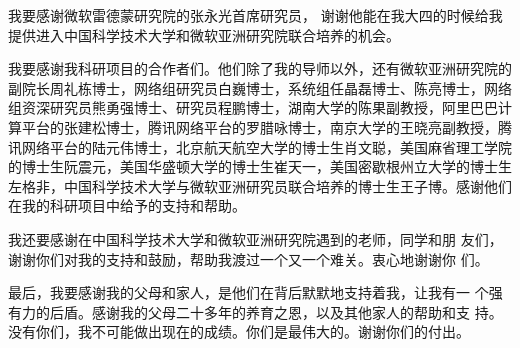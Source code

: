 \begin{acknowledgements}
我要感谢微软雷德蒙研究院的张永光首席研究员，
谢谢他能在我⼤四的时候给我提供进⼊中国科学技术⼤学和微软亚洲研究院联合培养的机会。

我要感谢我科研项⽬的合作者们。他们除了我的导师以外，还有微软亚洲研究院的副院长周礼栋博士，网络组研究员白巍博士，系统组任晶磊博士、陈亮博士，网络组资深研究员熊勇强博士、研究员程鹏博士，湖南⼤学的陈果副教授，阿⾥巴巴计算平台的张建松博士，腾讯⽹络平台的罗腊咏博士，南京⼤学的王晓亮副教授，腾讯网络平台的陆元伟博士，北京航天航空⼤学的博⼠⽣肖⽂聪，美国麻省理工学院的博⼠⽣阮震元，美国华盛顿大学的博士生崔天一，美国密歇根州立大学的博士生左格非，中国科学技术大学与微软亚洲研究员联合培养的博士生王子博。感谢他们在我的科研项⽬中给予的⽀持和帮助。

我还要感谢在中国科学技术⼤学和微软亚洲研究院遇到的⽼师，同学和朋
友们，谢谢你们对我的⽀持和⿎励，帮助我渡过⼀个又⼀个难关。衷⼼地谢谢你
们。

最后，我要感谢我的⽗母和家⼈，是他们在背后默默地⽀持着我，让我有⼀
个强有⼒的后盾。感谢我的⽗母⼆⼗多年的养育之恩，以及其他家⼈的帮助和⽀
持。没有你们，我不可能做出现在的成绩。你们是最伟⼤的。谢谢你们的付出。

\end{acknowledgements}
